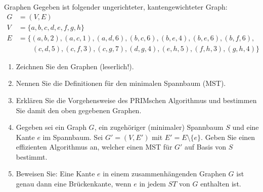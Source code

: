 \documentclass{article}
\begin{document}
\begin{exercise}{Graphen}
  Gegeben ist folgender ungerichteter, kantengewichteter Graph:
  \begin{align*}
    G & = (V, E)                                                                         \\
    V & = \{a, b, c, d, e, f, g, h\}                                                     \\
    E & = \{(a, b, 2), (a, c, 1), (a, d, 6), (b, c, 6), (b, e, 4), (b, e, 6), (b, f, 6), \\
      & \quad\quad(c, d, 5), (c, f, 3), (c, g, 7), (d,g,4), (e,h,5), (f,h,3), (g,h,4)\}
  \end{align*}
  \begin{enumerate}
    \item Zeichnen Sie den Graphen (leserlich!).
    \item Nennen Sie die Definitionen für den minimalen Spannbaum (MST).
    \item Erklären Sie die Vorgehensweise des PRIMschen Algorithmus und bestimmen Sie damit den oben gegebenen Graphen.
    \item Gegeben sei ein Graph $G$, ein zugehöriger (minimaler) Spannbaum $S$ und eine Kante $e$ im Spannbaum. Sei $G' = (V, E')$ mit $E' = E \setminus \{e\}$. Geben Sie einen effizienten Algorithmus an, welcher einen MST für $G'$ auf Basis von $S$ bestimmt.
    \item Beweisen Sie: Eine Kante $e$ in einem zusammenhängenden Graphen $G$ ist genau dann eine Brückenkante, wenn $e$ in jedem $ST$ von $G$ enthalten ist.
  \end{enumerate}


\end{exercise}
\end{document}
